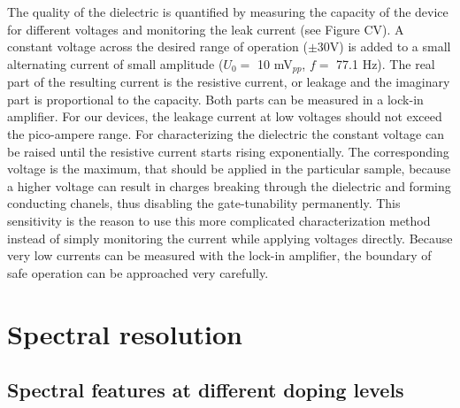 The quality of the dielectric is quantified by measuring the capacity of the device for different voltages and monitoring the leak current (see Figure CV). A constant voltage across the desired range of operation ({\small$\pm $}30V) is added to a small alternating current of small amplitude ($U_0 = $ 10 mV$_{pp}$, $f = $ 77.1 Hz). The real part of the resulting current is the resistive current, or leakage and the imaginary part is proportional to the capacity. Both parts can be measured in a lock-in amplifier. For our devices, the leakage current at low voltages should not exceed the pico-ampere range. For characterizing the dielectric the constant voltage can be raised until the resistive current starts rising exponentially. The corresponding voltage is the maximum, that should be applied in the particular sample, because a higher voltage can result in charges breaking through the dielectric and forming conducting chanels, thus disabling the gate-tunability permanently. This sensitivity is the reason to use this more complicated characterization method instead of simply monitoring the current while applying voltages directly. Because very low currents can be measured with the lock-in amplifier, the boundary of safe operation can be approached very carefully.


\section{Spectral resolution}
\subsection{Spectral features at different doping levels}

